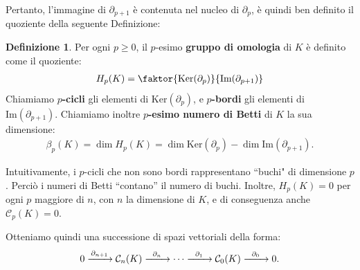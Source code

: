 \documentclass[a4paper, 12pt]{article}
\theoremstyle{definition}
\newtheorem{definition}{Definizione}[section]
\theoremstyle{remark}
\begin{document}
Pertanto, l'immagine di $\partial_{p+1}$ è contenuta nel nucleo di $\partial_p$, è quindi ben definito il quoziente della seguente Definizione:
\begin{definition}
    Per ogni $p \geq 0$, il $p$-esimo \textbf{gruppo di omologia} di $K$ è definito come il quoziente:
    \begin{align*}
        H_p(K) = \faktor{\text{Ker}(\partial_p)}{\text{Im}(\partial_{p+1})}
    \end{align*}
    Chiamiamo \textbf{$p$-cicli} gli elementi di $\text{Ker}(\partial_p)$, e \textbf{$p$-bordi} gli elementi di $\text{Im}(\partial_{p+1})$.
    Chiamiamo inoltre \textbf{$p$-esimo numero di Betti} di $K$ la sua dimensione:
    \begin{align*}
        \beta_p(K) = \dim H_p(K) = \dim \text{Ker}(\partial_p) - \dim \text{Im}(\partial_{p+1}).
    \end{align*}
\end{definition}

Intuitivamente, i $p$-cicli che non sono bordi rappresentano ``buchi" di dimensione $p$. Perciò i numeri di Betti ``contano'' il numero di buchi. Inoltre, $H_p(K) = 0$ per ogni $p$ maggiore di $n$, con $n$ la dimensione di $K$, e di conseguenza anche $\mathcal{C}_p(K) = 0$.

Otteniamo quindi una successione di spazi vettoriali della forma:
\begin{align*}
    0 \xrightarrow[\rule{20pt}{0pt}]{\partial_{n+1}} \mathcal{C}_n(K) \xrightarrow[\rule{20pt}{0pt}]{\partial_n} \cdots \xrightarrow[\rule{20pt}{0pt}]{\partial_1} \mathcal{C}_0(K) \xrightarrow[\rule{20pt}{0pt}]{\partial_0} 0.
\end{align*}
\end{document}
